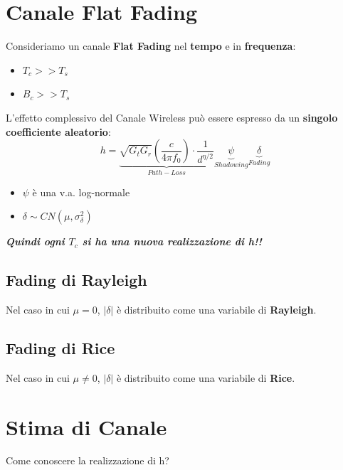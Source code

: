 \section{Canale Flat Fading}
Consideriamo un canale \textbf{Flat Fading} nel \textbf{tempo} e in \textbf{frequenza}:
\begin{itemize}
    \item $T_c >> T_s$
    \item $B_c >> T_s$
\end{itemize}

L'effetto complessivo del Canale Wireless può essere espresso da un \textbf{singolo coefficiente aleatorio}:
\begin{equation*}
    h =\underbrace{\sqrt{G_t G_r} \left(\frac{c}{4\pi f_0}\right) \cdot \frac{1}{d^{\eta/2}}}_{Path-Loss} \underbrace{\psi}_{Shadowing} \underbrace{\delta}_{Fading}
\end{equation*}

\begin{itemize}
    \item $\psi$ è una v.a. log-normale
    \item $\delta \sim  CN(\mu,\sigma_\delta^2)$ 
\end{itemize}

\textit{\textbf{Quindi ogni $T_c$ si ha una nuova realizzazione di h!!}}
\\

\subsection{Fading di Rayleigh}
Nel caso in cui $\mu=0$, $|\delta|$ è distribuito come una variabile di \textbf{Rayleigh}.
\\

\subsection{Fading di Rice}
Nel caso in cui $\mu \neq 0$, $|\delta|$ è distribuito come una variabile di \textbf{Rice}.


\section{Stima di Canale}
\begin{center}
    Come conoscere la realizzazione di h?
\end{center}

